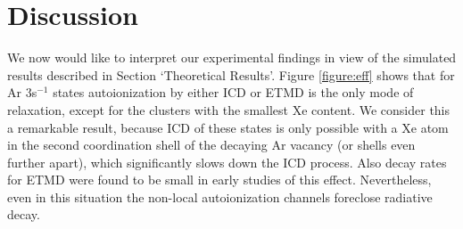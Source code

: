 \section{Discussion
\label{sec:discussion}}
%
%
%
%
%
%
We now would like to interpret our experimental findings in view of the simulated results described in Section `Theoretical Results'.
Figure \ref{figure:eff} shows that for Ar 3s$^{-1}$ states autoionization by either ICD or ETMD is the only mode of relaxation, except for the clusters with the smallest Xe content.
We consider this a remarkable result, because ICD of these states is only possible with a Xe atom in the second coordination shell of the decaying Ar vacancy (or shells even further apart), which significantly slows down the ICD process.
Also decay rates for ETMD were found to be small in early studies of this effect.\cite{zobeley}
Nevertheless, even in this situation the non-local autoionization channels foreclose radiative decay.

